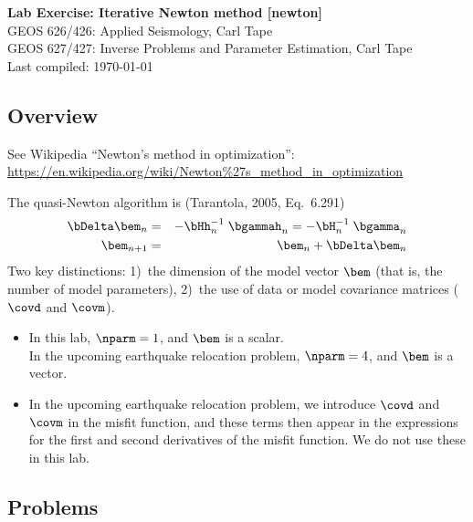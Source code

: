 \documentclass[11pt,titlepage,fleqn]{article}
\begin{document}

\begin{spacing}{1.2}
\centering
{\large \bf Lab Exercise: Iterative Newton method [newton]} \\
GEOS 626/426: Applied Seismology, Carl Tape \\
GEOS 627/427: Inverse Problems and Parameter Estimation, Carl Tape \\
Last compiled: \today
\end{spacing}


\subsection*{Overview}

See Wikipedia ``Newton's method in optimization'': \\
\url{https://en.wikipedia.org/wiki/Newton%27s_method_in_optimization}

The quasi-Newton algorithm is (\eg Tarantola, 2005, Eq.~6.291)
%
\begin{eqnarray}
\bDelta\bem_n &=& -\bHh_n^{-1}\; \bgammah_n = -\bH_n^{-1}\; \bgamma_n
\label{eq1}
\\
\bem_{n+1} &=& \bem_n + \bDelta\bem_n
\label{eq2}
\end{eqnarray}
%
Two key distinctions:
1)~the dimension of the model vector $\bem$ (that is, the number of model parameters),
2)~the use of data or model covariance matrices ($\covd$ and $\covm$).
%
\begin{itemize}
\item In this lab, $\nparm = 1$, and $\bem$ is a scalar. \\
      In the upcoming earthquake relocation problem, $\nparm = 4$, and $\bem$ is a vector.

\item In the upcoming earthquake relocation problem, we introduce $\covd$ and $\covm$ in the misfit function, and these terms then appear in the expressions for the first and second derivatives of the misfit function. We do not use these in this lab.
\end{itemize}


\subsection*{Problems}
\end{document}
